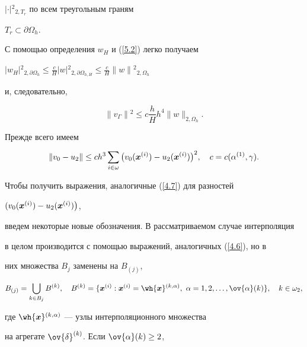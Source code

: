 \begin{pf}
$|\cdot|{^2}_{2,T_r}$ по всем треугольным граням


$T_r\subset\partial\Omega_h$.


С помощью определения $w_H$ и (\ref{5.2}) легко получаем


$|w_H|{^2}_{{2,\partial\Omega_h}}\le\frac{c}{H}


|w|{^2}_{{2,\partial\Omega_{h,H}}}\le\frac{c}{H}\|w\|{^2}_{2,\Omega_h}$


и, следовательно,


\begin{equation}\label{5.14}


\|v_\Gamma\|{^2}\le c\frac{h}{H} h^4\|w\|_{{2,\Omega_h}}.


\end{equation}





Прежде всего имеем


\begin{equation}\label{5.15}


\|v_0-u_2\|\le ch^3\sum_{i\in \omega}\big(v_0({\bi x}\up i)-


u_2({\bi x}\up i)\big)^2,


\quad c=c(\alpha \up 1, \gamma).


\end{equation}





Чтобы получить выражения, аналогичные (\ref{4.7}) для разностей


$(v_0({\boldsymbol x}^{(i)})-u_2({\boldsymbol x}^{(i)})\big)$,


введем некоторые новые обозначения. В рассматриваемом случае интерполяция 


в целом производится с помощью выражений, аналогичных (\ref{4.6}), но в 


них множества $B_j$ заменены на $B_{(j)}$,


$$


B_{(j)}=\bigcup_{k\in B_{j}} B\up k,\quad B\up k=\{{\bi x}\up i:


{\bi x}\up i={\wh {\bi x}}\upp{k}{\alpha},


\ \alpha=1,2,\dotsc,\ov{\alpha}(k)\},


\quad k\in\omega_2,


$$


где ${\wh {\bi x}}\upp{k}{\alpha}$ --- узлы интерполяционного множества


на агрегате $\ov{\delta}\up k$. Если $\ov{\alpha}(k)\ge 2$,



\end{pf}
